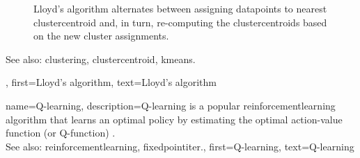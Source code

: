 {{\begin{figure}
\begin{center}
			\end{center}
			\caption{Lloyd's \gls{algorithm} alternates between assigning \glspl{datapoint} to 
					nearest \gls{clustercentroid} and, in turn, re-computing the \glspl{clustercentroid} 
					based on the new \gls{cluster} assignments. 
			\label{fig_lloyd_algorithm_dict}}
		\end{figure}
		See also: \gls{clustering}, \gls{clustercentroid}, \gls{kmeans}.},
	first={Lloyd's algorithm},
	text={Lloyd's algorithm} 
}

{name={Q-learning}, 
	description={Q-learning is a popular \gls{reinforcementlearning} 
	     \gls{algorithm} that learns an optimal policy by estimating the optimal action-value 
		function (or Q-function) \cite{SuttonEd2}.  \\
		See also: \gls{reinforcementlearning}, \gls{fixedpointiter}.},
	first={Q-learning},
	text={Q-learning} 
}

